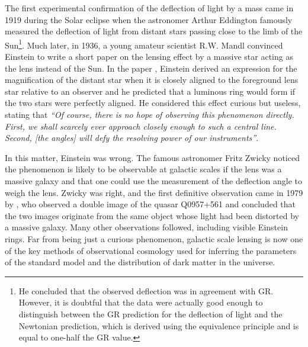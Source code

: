\documentclass[12pt,dvipsnames]{report}
\begin{document}
The first experimental confirmation of the deflection of light by a mass came
in 1919 during the Solar eclipse when the astronomer Arthur Eddington famously
measured the deflection of light from distant stars passing close to the limb
of the Sun\footnote{He concluded that the observed deflection was in agreement
    with GR. However, it is doubtful that the data were actually good enough to
    distinguish between the GR prediction for the deflection of light and the
    Newtonian prediction, which is derived using the equivalence principle and is
    equal to one-half the GR value.}. Much later, in 1936, a young amateur scientist
R.W. Mandl convinced Einstein to write a short paper on the lensing effect by
a massive star acting as the lens instead of the Sun. In the paper
\citep{1936Sci....84..506E}, Einstein derived an expression for the
magnification of the distant star when it is closely aligned to the foreground
lens star relative to an observer and he predicted that a luminous ring would
form if the two stars were perfectly aligned. He considered this effect curious
but useless, stating that \emph{``Of course, there is no hope of observing this
    phenomenon directly. First, we shall scarcely ever approach closely enough to
    such a central line. Second, [the angles] will defy the resolving power of our
    instruments''}.

In this matter, Einstein was wrong. The famous astronomer Fritz Zwicky noticed
the phenomenon is likely to be observable at galactic scales if the lens was a
massive galaxy \citep{1937PhRv...51..290Z,1937PhRv...51..679Z} and that one
could use the measurement of the deflection angle to weigh the lens. Zwicky was
right, and the first definitive observation came in 1979 by
\citet{1980ApJ...241..507Y}, who observed a double image of the quasar Q0957+561
and concluded that the two images originate from the same object whose light had been
distorted by a massive galaxy. Many other observations followed, including
visible Einstein rings. Far from being just a curious phenomenon, galactic
scale lensing is now one of the key methods of observational cosmology used
for inferring the parameters of the standard model and the distribution of dark
matter in the universe.
\end{document}
